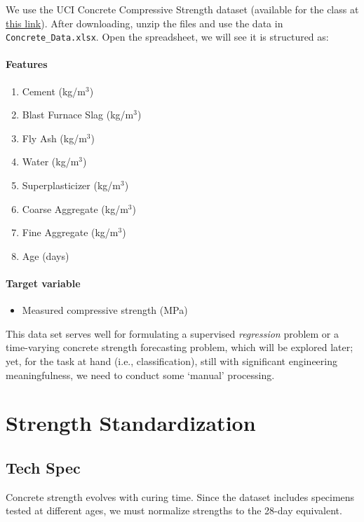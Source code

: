 \documentclass[12pt]{article}
\begin{document}
We use the UCI Concrete Compressive Strength dataset (available for the class at 
\href{https://umsystem.instructure.com/courses/407601/files/40676265?module_item_id=11763333}{this link}). 
After downloading, unzip the files and use the data in \texttt{Concrete\_Data.xlsx}. Open the spreadsheet, we will see it is structured as: 

\paragraph{Features}
\begin{enumerate}
    \item Cement (kg/m$^3$)
    \item Blast Furnace Slag (kg/m$^3$)
    \item Fly Ash (kg/m$^3$)
    \item Water (kg/m$^3$)
    \item Superplasticizer (kg/m$^3$)
    \item Coarse Aggregate (kg/m$^3$)
    \item Fine Aggregate (kg/m$^3$)
    \item Age (days)
\end{enumerate}

\paragraph{Target variable}
\begin{itemize}
    \item Measured compressive strength (MPa)
\end{itemize}

This data set serves well for formulating a supervised \textit{regression} problem or a time-varying concrete strength forecasting problem, which will be explored later; yet, for the task at hand (i.e., classification), still with significant engineering meaningfulness, we need to conduct some `manual' processing. 

\section*{Strength Standardization}
\subsection*{Tech Spec}
Concrete strength evolves with curing time. Since the dataset includes specimens tested at different ages, we must normalize strengths to the 28-day equivalent.
\end{document}
